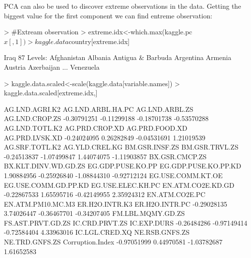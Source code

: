 \documentclass[a4paper]{article}
\begin{document}
PCA can also be used to discover extreme observations in the data. Getting the
biggest value for the first component we can find entreme observation: 
\begin{Schunk}
\begin{Sinput}
> #Extream observation
> extreme.idx<-which.max(kaggle.pc$x[,1])
> kaggle.data$country[extreme.idx]
\end{Sinput}
\begin{Soutput}
[1] Iraq
87 Levels: Afghanistan Albania Antigua & Barbuda Argentina Armenia Austria Azerbaijan ... Venezuela
\end{Soutput}
\begin{Sinput}
> kaggle.data.scaled<-scale(kaggle.data[variable.names])
> kaggle.data.scaled[extreme.idx,]
\end{Sinput}
\begin{Soutput}
      AG.LND.AGRI.K2    AG.LND.ARBL.HA.PC       AG.LND.ARBL.ZS       AG.LND.CROP.ZS 
         -0.30791251          -0.11299188          -0.18701738          -0.53570288 
      AG.LND.TOTL.K2       AG.PRD.CROP.XD       AG.PRD.FOOD.XD       AG.PRD.LVSK.XD 
         -0.24024095           0.26282849          -0.04531691           1.21019539 
      AG.SRF.TOTL.K2       AG.YLD.CREL.KG       BM.GSR.INSF.ZS       BM.GSR.TRVL.ZS 
         -0.24513837          -1.07499847           1.44074075          -1.11903857 
      BX.GSR.CMCP.ZS BX.KLT.DINV.WD.GD.ZS    EG.GDP.PUSE.KO.PP EG.GDP.PUSE.KO.PP.KD 
          1.90884956          -0.25926840          -1.08844310          -0.92712124 
   EG.USE.COMM.KT.OE EG.USE.COMM.GD.PP.KD    EG.USE.ELEC.KH.PC    EN.ATM.CO2E.KD.GD 
         -0.22867533           1.65595716          -0.42149955           2.35924312 
      EN.ATM.CO2E.PC    EN.ATM.PM10.MC.M3       ER.H2O.INTR.K3       ER.H2O.INTR.PC 
         -0.29028135           3.74026447          -0.36467701          -0.34207405 
   FM.LBL.MQMY.GD.ZS    FS.AST.PRVT.GD.ZS       IC.CRD.PRVT.ZS          IC.EXP.DURS 
         -0.26484286          -0.97149414          -0.72584404           4.33963016 
      IC.LGL.CRED.XQ       NE.RSB.GNFS.ZS       NE.TRD.GNFS.ZS     Corruption.Index 
         -0.97051999           0.44970581          -1.03782687           1.61652583 
\end{Soutput}
\end{Schunk}
\end{document}
